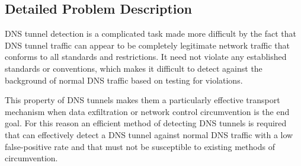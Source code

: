 \documentclass{llncs}
\begin{document}

\subsection{Detailed Problem Description}

DNS tunnel detection is a complicated
task made more difficult by the fact that DNS tunnel traffic can appear to be completely
legitimate network traffic that conforms to all standards and restrictions. It
need not violate any established standards or conventions, which makes it
difficult to detect against the background of normal DNS traffic based on
testing for violations.

This property of DNS tunnels makes them a particularly effective transport
mechanism when data exfiltration or network control circumvention is the end
goal. For this reason an efficient method of detecting DNS tunnels is required
that can effectively detect a DNS tunnel against normal DNS traffic with a low
false-positive rate and that must not be susceptible to existing methods of
circumvention.

\end{document}
